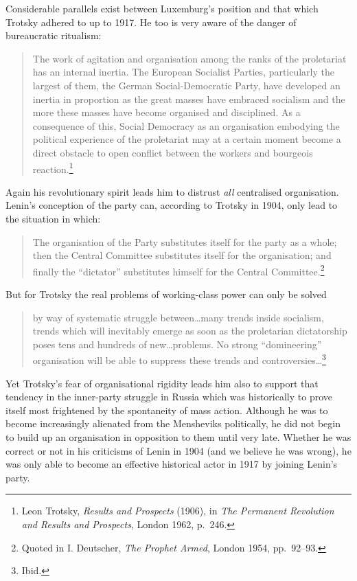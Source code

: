 Considerable parallels exist between Luxemburg's position and that which Trotsky adhered to up to 1917. He too is very aware of the danger of bureaucratic ritualism:

\blockquote{The work of agitation and organisation among the ranks of the proletariat has an internal inertia. The European Socialist Parties, particularly the largest of them, the German Social-Democratic Party, have developed an inertia in proportion as the great masses have embraced socialism and the more these masses have become organised and disciplined. As a consequence of this, Social Democracy as an organisation embodying the political experience of the proletariat may at a certain moment become a direct obstacle to open conflict between the workers and bourgeois reaction.\footnote{Leon Trotsky, \emph{Results and Prospects} (1906), in \emph{The Permanent Revolution and Results and Prospects}, London 1962, p.~246.}}

Again his revolutionary spirit leads him to distrust \emph{all} centralised organisation. Lenin's conception of the party can, according to Trotsky in 1904, only lead to the situation in which:

\blockquote{The organisation of the Party substitutes itself for the party as a whole; then the Central Committee substitutes itself for the organisation; and finally the ``dictator'' substitutes himself for the Central Committee.\footnote{Quoted in I. Deutscher, \emph{The Prophet Armed}, London 1954, pp.~92--93.}}

But for Trotsky the real problems of working-class power can only be solved

\blockquote{by way of systematic struggle between\ldots many trends inside socialism, trends which will inevitably emerge as soon as the proletarian dictatorship poses tens and hundreds of new\ldots problems. No strong ``domineering'' organisation will be able to suppress these trends and controversies\ldots\footnote{Ibid.}}

Yet Trotsky's fear of organisational rigidity leads him also to support that tendency in the inner-party struggle in Russia which was historically to prove itself most frightened by the spontaneity of mass action. Although he was to become increasingly alienated from the Mensheviks politically, he did not begin to build up an organisation in opposition to them until very late. Whether he was correct or not in his criticisms of Lenin in 1904 (and we believe he was wrong), he was only able to become an effective historical actor in 1917 by joining Lenin's party.

